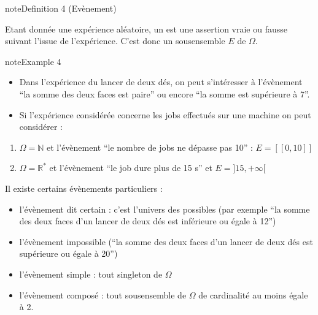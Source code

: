 \documentclass[letterpaper,10pt,english]{jupyterBook}
\begin{document}
\ignorespaces \label{Rappels:evenement}
\begin{sphinxadmonition}{note}{Definition 4 (Evènement)}



\sphinxAtStartPar
Etant donnée une expérience aléatoire, un  est une assertion vraie ou fausse suivant l’issue de l’expérience. C’est donc un sous\sphinxhyphen{}ensemble \(E\) de \(\Omega\).
\end{sphinxadmonition}
\label{Rappels:example-6}
\begin{sphinxadmonition}{note}{Example 4}


\begin{itemize}
\item {} 
\sphinxAtStartPar
Dans l’expérience du lancer de deux dés, on peut s’intéresser à l’évènement “la somme des deux faces est paire” ou encore  “la somme est supérieure à 7”.

\item {} 
\sphinxAtStartPar
Si l’expérience considérée concerne les jobs effectués sur une machine on peut considérer :

\end{itemize}
\begin{enumerate}
%
\item {} 
\sphinxAtStartPar
\(\Omega=\mathbb{N}\) et l’évènement “le nombre de jobs ne dépasse pas 10” : \(E=[\![0,10]\!]\)

\item {} 
\sphinxAtStartPar
\(\Omega=\mathbb{R}^*\) et  l’évènement “le job dure plus de 15 s” et \(E=]15,+\infty[\)

\end{enumerate}
\end{sphinxadmonition}

\sphinxAtStartPar
Il existe certains évènements particuliers :
\begin{itemize}
\item {} 
\sphinxAtStartPar
l’évènement dit certain : c’est l’univers des possibles (par exemple “la somme des deux faces d’un lancer de deux dés est inférieure ou égale à 12”)

\item {} 
\sphinxAtStartPar
l’évènement impossible (“la somme des deux faces d’un lancer de deux dés est supérieure ou égale à 20”)

\item {} 
\sphinxAtStartPar
l’évènement simple : tout singleton de \(\Omega\)

\item {} 
\sphinxAtStartPar
l’évènement composé : tout sous\sphinxhyphen{}ensemble de \(\Omega\) de cardinalité au moins égale à 2.

\end{itemize}
\end{document}
